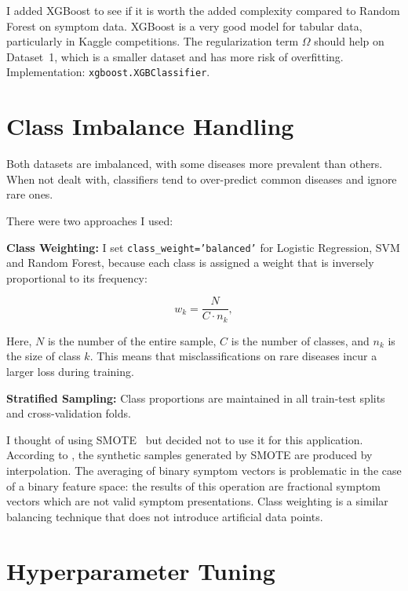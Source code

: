I added XGBoost to see if it is worth the added complexity compared to Random Forest on symptom data. XGBoost is a very good model for tabular data, particularly in Kaggle competitions. The regularization term $\Omega$ should help on Dataset~1, which is a smaller dataset and has more risk of overfitting. Implementation: \texttt{xgboost.XGBClassifier}.

\section{Class Imbalance Handling}
\label{sec:class_imbalance}

Both datasets are imbalanced, with some diseases more prevalent than others. When not dealt with, classifiers tend to over-predict common diseases and ignore rare ones.

There were two approaches I used:

\textbf{Class Weighting:} I set \texttt{class\_weight='balanced'} for Logistic Regression, SVM and Random Forest, because each class is assigned a weight that is inversely proportional to its frequency:

\begin{equation}
\label{eq:class_weight}
w_k = \frac{N}{C \cdot n_k},
\end{equation}

\noindent Here, $N$ is the number of the entire sample, $C$ is the number of classes, and $n_k$ is the size of class $k$. This means that misclassifications on rare diseases incur a larger loss during training.

\textbf{Stratified Sampling:} Class proportions are maintained in all train-test splits and cross-validation folds.

I thought of using SMOTE~\citep{Chawla2002} but decided not to use it for this application. According to \citet{Fernandez2018}, the synthetic samples generated by SMOTE are produced by interpolation. The averaging of binary symptom vectors is problematic in the case of a binary feature space: the results of this operation are fractional symptom vectors which are not valid symptom presentations. Class weighting is a similar balancing technique that does not introduce artificial data points.

\section{Hyperparameter Tuning}
\label{sec:hyperparameter_tuning}

